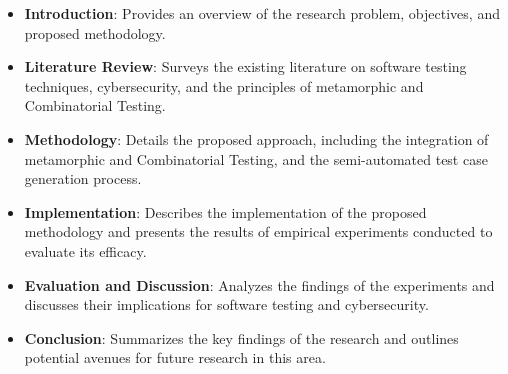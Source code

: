 \begin{itemize}
    \item \textbf{Introduction}: Provides an overview of the research problem, objectives, and proposed methodology.
    \item \textbf{Literature Review}: Surveys the existing literature on software testing techniques, cybersecurity, and the principles of metamorphic and Combinatorial Testing.
    \item \textbf{Methodology}: Details the proposed approach, including the integration of metamorphic and Combinatorial Testing, and the semi-automated test case generation process.
    \item \textbf{Implementation}: Describes the implementation of the proposed methodology and presents the results of empirical experiments conducted to evaluate its efficacy.
    \item \textbf{Evaluation and Discussion}: Analyzes the findings of the experiments and discusses their implications for software testing and cybersecurity.
    \item \textbf{Conclusion}: Summarizes the key findings of the research and outlines potential avenues for future research in this area.
\end{itemize}

